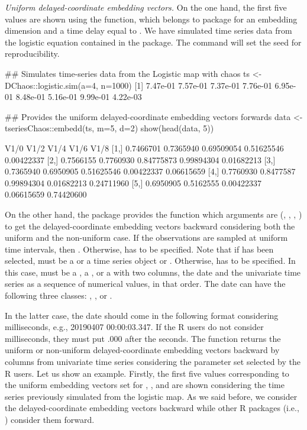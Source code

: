 \textit{Uniform delayed-coordinate embedding vectors.} On the one hand, the first five values are shown using the  function, which belongs to  package for an embedding dimension  and a time delay equal to  . We have simulated time series data from the logistic equation contained in the  package. The command  will set the seed for reproducibility.

\begin{example}
## Simulates time-series data from the Logistic map with chaos
ts    <- DChaos::logistic.sim(a=4, n=1000)
[1] 7.47e-01 7.57e-01 7.37e-01 7.76e-01 6.95e-01 8.48e-01 5.16e-01 9.99e-01 4.22e-03 

## Provides the uniform delayed-coordinate embedding vectors forwards
data  <- tseriesChaos::embedd(ts, m=5, d=2)
show(head(data, 5))

     V1/0      V1/2      V1/4       V1/6       V1/8
[1,] 0.7466701 0.7365940 0.69509054 0.51625546 0.00422337
[2,] 0.7566155 0.7760930 0.84775873 0.99894304 0.01682213
[3,] 0.7365940 0.6950905 0.51625546 0.00422337 0.06615659
[4,] 0.7760930 0.8477587 0.99894304 0.01682213 0.24711960
[5,] 0.6950905 0.5162555 0.00422337 0.06615659 0.74420600
\end{example}

On the other hand, the  package provides the function  which arguments are (, , , ) to get the delayed-coordinate embedding vectors backward considering both the uniform and the non-uniform case. If the observations are sampled at uniform time intervals, then . Otherwise,  has to be specified. Note that if  has been selected,  must be a  or a time series object  or . Otherwise,  has to be specified. In this case,  must be a , a , or a  with two columns, the date and the univariate time series as a sequence of numerical values, in that order. The date can have the following three classes: , , or . 

\newpage
In the latter case, the date should come in the following format  considering milliseconds, e.g., 20190407 00:00:03.347. If the R users do not consider milliseconds, they must put .000 after the seconds. The function  returns the uniform or non-uniform delayed-coordinate embedding vectors backward by columns from univariate time series considering the parameter set selected by the R users. Let us show an example. Firstly, the first five values corresponding to the uniform embedding vectors set for , , and  are shown considering the time series previously simulated from the logistic map. As we said before, we consider the delayed-coordinate embedding vectors backward while other R packages (i.e., ) consider them forward.


